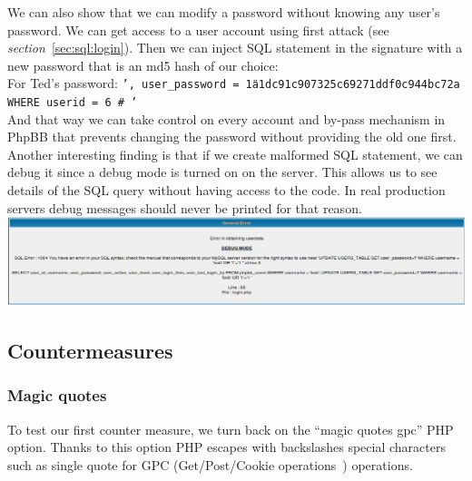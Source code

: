 \documentclass[12pt, a4paper]{article}
\begin{document}
We can also show that we can modify a password without knowing any user's password. We can get access to a user account using first attack (see \emph{section}~\ref{sec:sql:login}). Then we can inject SQL statement in the signature with a new password that is an md5 hash of our choice:\\
For Ted's password: \texttt{', user\_password = \"1a1dc91c907325c69271ddf0c944bc72a WHERE userid = 6 \# '}\\
And that way we can take control on every account and by-pass mechanism in PhpBB that prevents changing the password without providing the old one first.\\

Another interesting finding is that if we create malformed SQL statement, we can debug it since a debug mode is turned on on the server. This allows us to see details of the SQL query without having access to the code. In real production servers debug messages should never be printed for that reason.\\
\includegraphics[width=.95\textwidth]{gfx/sql/debug.png}

\subsection{Countermeasures}

\subsubsection{Magic quotes}
To test our first counter measure, we turn back on the ``magic quotes gpc'' PHP option. Thanks to this option PHP escapes with backslashes special characters such as single quote for GPC (Get/Post/Cookie operations~\cite{phpman}) operations.
\end{document}

